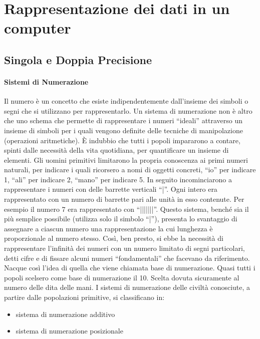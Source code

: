\documentclass{article}
\theoremstyle{plain}
\theoremstyle{definition}
\theoremstyle{remark}
\begin{document}
\section{Rappresentazione dei dati in un computer}

\subsection{Singola e Doppia Precisione}

\paragraph{Sistemi di Numerazione}
Il numero è un concetto che esiste indipendentemente dall'insieme dei simboli o segni che si utilizzano per rappresentarlo.
Un sistema di numerazione non è altro che uno schema che permette di rappresentare i numeri “ideali” attraverso un insieme di simboli per i quali vengono definite delle tecniche di manipolazione (operazioni aritmetiche).
È indubbio che tutti i popoli impararono a contare, spinti dalle necessità della vita quotidiana, per quantificare un insieme di elementi.
Gli uomini primitivi limitarono la propria conoscenza ai primi numeri naturali, per indicare i quali ricorsero a nomi di oggetti concreti, “io” per indicare 1, “ali” per indicare 2, “mano” per indicare 5.
In seguito incominciarono a rappresentare i numeri con delle barrette verticali “|”. Ogni intero era rappresentato con un numero di barrette pari alle unità in esso contenute. Per esempio il numero 7 era rappresentato con “|||||||”.
Questo sistema, benché sia il più semplice possibile (utilizza solo il simbolo “|”), presenta lo svantaggio di assegnare a ciascun numero una rappresentazione la cui lunghezza è proporzionale al numero stesso.
Così, ben presto, si ebbe la necessità di rappresentare l'infinità dei numeri con un numero limitato di segni particolari, detti cifre e di fissare alcuni numeri “fondamentali” che facevano da riferimento.
Nacque così l'idea di quella che viene chiamata base di numerazione.
Quasi tutti i popoli scelsero come base di numerazione il 10. Scelta dovuta sicuramente al numero delle dita delle mani.
I sistemi di numerazione delle civiltà conosciute, a partire dalle popolazioni primitive, si classificano in:
\begin{itemize}
    \item sistema di numerazione additivo
    \item sistema di numerazione posizionale
\end{itemize}
\end{document}
